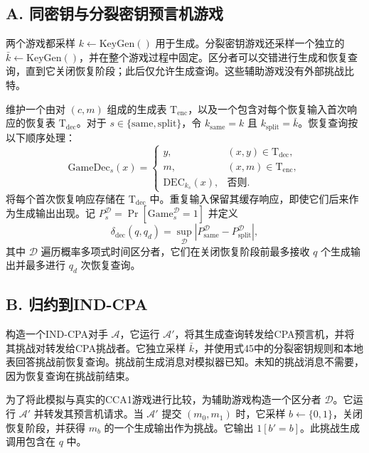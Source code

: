 \documentclass[UTF8,a4paper,zihao=-4,fontset=windows,openany]{ctexbook}
\begin{document}
\subsection*{A. 同密钥与分裂密钥预言机游戏}

两个游戏都采样 \(k \leftarrow \mathrm{KeyGen}()\) 用于生成。分裂密钥游戏还采样一个独立的 \(\bar{k} \leftarrow \mathrm{KeyGen}()\)，并在整个游戏过程中固定。区分者可以交错进行生成和恢复查询，直到它关闭恢复阶段；此后仅允许生成查询。这些辅助游戏没有外部挑战比特。

维护一个由对 \((c, m)\) 组成的生成表 \(\mathrm{T}_{\mathrm{enc}}\)，以及一个包含对每个恢复输入首次响应的恢复表 \(\mathrm{T}_{\mathrm{dec}}\)。对于 \(s \in \{\mathrm{same}, \mathrm{split}\}\)，令 \(k_{\mathrm{same}} = k\) 且 \(k_{\mathrm{split}} = \bar{k}\)。恢复查询按以下顺序处理：
\begin{equation}
\mathrm{GameDec}_s(x) = 
\begin{cases}
y, & (x, y) \in \mathrm{T}_{\mathrm{dec}}, \\
m, & (x, m) \in \mathrm{T}_{\mathrm{enc}}, \\
\mathrm{DEC}_{k_s}(x), & \text{否则}.
\end{cases} \tag{45}
\end{equation}
将每个首次恢复响应存储在 \(\mathrm{T}_{\mathrm{dec}}\) 中。重复输入保留其缓存响应，即使它们后来作为生成输出出现。记 \(P_s^{\mathcal{D}} = \Pr[\mathrm{Game}_s^{\mathcal{D}} = 1]\) 并定义
\begin{equation}
\delta_{\mathrm{dec}}(q, q_d) = \sup_{\mathcal{D}} \left| P_{\mathrm{same}}^{\mathcal{D}} - P_{\mathrm{split}}^{\mathcal{D}} \right|, \tag{46}
\end{equation}
其中 \(\mathcal{D}\) 遍历概率多项式时间区分者，它们在关闭恢复阶段前最多接收 \(q\) 个生成输出并最多进行 \(q_d\) 次恢复查询。

\subsection*{B. 归约到IND-CPA}

构造一个IND-CPA对手 \(\mathcal{A}\)，它运行 \(\mathcal{A}'\)，将其生成查询转发给CPA预言机，并将其挑战对转发给CPA挑战者。它独立采样 \(\bar{k}\)，并使用式45中的分裂密钥规则和本地表回答挑战前恢复查询。挑战前生成消息对模拟器已知。未知的挑战消息不需要，因为恢复查询在挑战前结束。

为了将此模拟与真实的CCA1游戏进行比较，为辅助游戏构造一个区分者 \(\mathcal{D}\)。它运行 \(\mathcal{A}'\) 并转发其预言机请求。当 \(\mathcal{A}'\) 提交 \((m_0, m_1)\) 时，它采样 \(b \leftarrow \{0, 1\}\)，关闭恢复阶段，并获得 \(m_b\) 的一个生成输出作为挑战。它输出 \(1[b' = b]\)。此挑战生成调用包含在 \(q\) 中。
\end{document}
